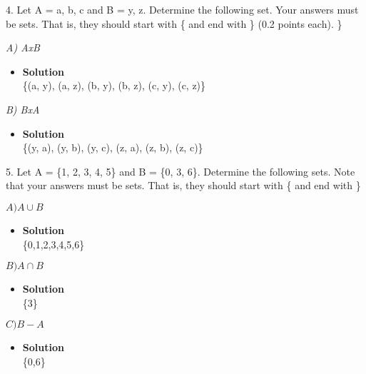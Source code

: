 \documentclass[11pt]{article}
\begin{document}
\begin{enumerate}

\begin{flushleft}
{\large 4. Let A = {a, b, c} and B = {y, z}. Determine the following set. Your answers must be sets. That is,
they should start with \{ and end with \} (0.2 points each). \}}
\end{flushleft}



 \emph{A) AxB}\\
 \begin{itemize}
\item \textbf{Solution}\\
\large \{(a, y), (a, z), (b, y), (b, z), (c, y), (c, z)\}\\
\end {itemize}

 \emph{B) BxA}\\
 \begin{itemize}
\item \textbf{Solution}\\
\large \{(y, a), (y, b), (y, c), (z, a), (z, b), (z, c)\}\\


\end {itemize}
\end {enumerate}


\begin{enumerate}

\begin{flushleft}
{\large 5. Let A = \{1, 2, 3, 4, 5\} and B = \{0, 3, 6\}. Determine the following sets. Note that your answers must
be sets. That is, they should start with \{ and end with \}}
\end{flushleft}



 \emph{$A) A \cup B$}\\
 \begin{itemize}
\item \textbf{Solution}\\
\large \{0,1,2,3,4,5,6\}\\
\end {itemize}


 \emph{$B) A \cap B$}\\
 \begin{itemize}
\item \textbf{Solution}\\
\large \{3\}\\

\end {itemize}

 \emph{$C) B - A $}\\
 \begin{itemize}
\item \textbf{Solution}\\
\large \{0,6\}\\

\end {itemize}
\end {enumerate}
\end{document}
